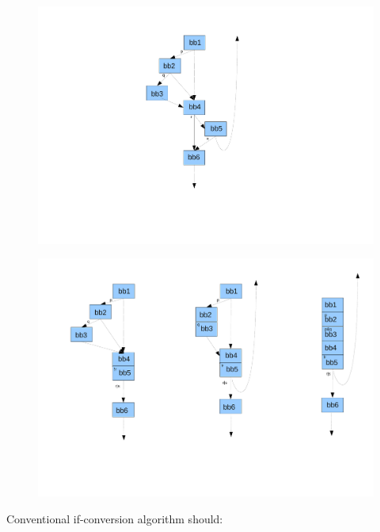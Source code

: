 \begin{figure}[th]
\begin{minipage}[b]{3cm}
\includegraphics[scale=0.3]{hyper1.pdf}
\end{minipage}
\label{fig:hyper1}
\end{figure}

\begin{figure}[th]
\begin{minipage}[b]{3cm}
\includegraphics[scale=0.3]{hyper2.pdf}
\end{minipage}
\label{fig:hyper2}
\end{figure}

Conventional if-conversion algorithm should:

